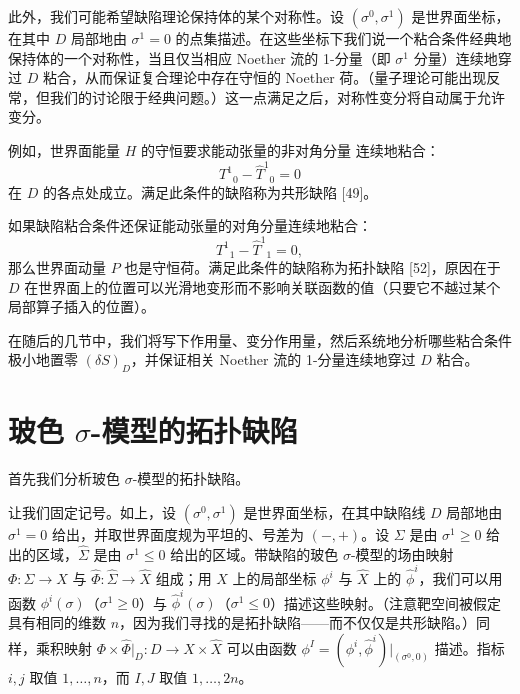 此外，我们可能希望缺陷理论保持体的某个对称性。设 $(\sigma^0,\sigma^1)$ 是世界面坐标，在其中 $D$ 局部地由 $\sigma^1=0$ 的点集描述。在这些坐标下我们说一个粘合条件经典地保持体的一个对称性，当且仅当相应 Noether 流的 1-分量（即 $\sigma^1$ 分量）连续地穿过 $D$ 粘合，从而保证复合理论中存在守恒的 Noether 荷。（量子理论可能出现反常，但我们的讨论限于经典问题。）这一点满足之后，对称性变分将自动属于允许变分。

例如，世界面能量 $H$ 的守恒要求能动张量的非对角分量
连续地粘合：
\[
T^1{}_0-\hat T^1{}_0=0
\]
在 $D$ 的各点处成立。满足此条件的缺陷称为共形缺陷 [49]。

如果缺陷粘合条件还保证能动张量的对角分量连续地粘合：
\[
T^1{}_1-\hat T^1{}_1=0,
\]
那么世界面动量 $P$ 也是守恒荷。满足此条件的缺陷称为拓扑缺陷 [52]，原因在于 $D$ 在世界面上的位置可以光滑地变形而不影响关联函数的值（只要它不越过某个局部算子插入的位置）。

在随后的几节中，我们将写下作用量、变分作用量，然后系统地分析哪些粘合条件极小地置零 $(\delta S)_D$，并保证相关 Noether 流的 1-分量连续地穿过 $D$ 粘合。

\section{玻色 \texorpdfstring{$\sigma$}{σ}-模型的拓扑缺陷}

首先我们分析玻色 $\sigma$-模型的拓扑缺陷。

让我们固定记号。如上，设 $(\sigma^0,\sigma^1)$ 是世界面坐标，在其中缺陷线 $D$ 局部地由 $\sigma^1=0$ 给出，并取世界面度规为平坦的、号差为 $(-,+)$。设 $\Sigma$ 是由 $\sigma^1\ge 0$ 给出的区域，$\hat\Sigma$ 是由 $\sigma^1\le 0$ 给出的区域。带缺陷的玻色 $\sigma$-模型的场由映射 $\Phi:\Sigma\to X$ 与 $\hat\Phi:\hat\Sigma\to\hat X$ 组成；用 $X$ 上的局部坐标 $\phi^i$ 与 $\hat X$ 上的 $\hat\phi^i$，我们可以用函数 $\phi^i(\sigma)$（$\sigma^1\ge0$）与 $\hat\phi^i(\sigma)$（$\sigma^1\le0$）描述这些映射。（注意靶空间被假定具有相同的维数 $n$，因为我们寻找的是拓扑缺陷——而不仅仅是共形缺陷。）同样，乘积映射 $\Phi\times\hat\Phi|_D:D\to X\times\hat X$ 可以由函数 $\phi^I=(\phi^i,\hat\phi^i)|_{(\sigma^0,0)}$ 描述。指标 $i,j$ 取值 $1,\ldots,n$，而 $I,J$ 取值 $1,\ldots,2n$。

